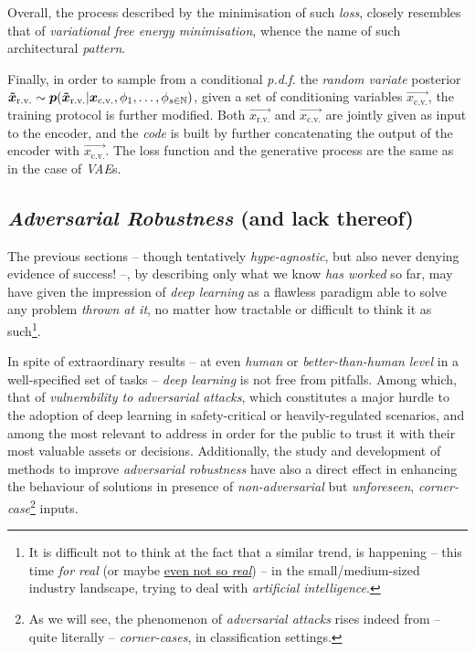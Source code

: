 Overall, the process described by the minimisation of such \textit{loss}, closely resembles that of \textit{variational free energy minimisation}, whence the name of such architectural \textit{pattern}.

Finally, in order to sample from a conditional \textit{p.d.f.} the \textit{random variate} posterior\linebreak
${\bm{\tilde{x}_{\text{r.v.}}} \sim \bm{p}(\bm{\tilde{x}_{\text{r.v.}}} | \bm{{x}_{\text{c.v.}}}, \phi_1, \dots, \phi_{s\in\mathbb{N}})}$, given a set of conditioning variables $\vec{{x}_{\text{c.v.}}}$, the training protocol is further modified. Both $\vec{{x}_{\text{r.v.}}}$ and $\vec{{x}_{\text{c.v.}}}$ are jointly given as input to the encoder, and the \textit{code} is built by further concatenating the output of the encoder with $\vec{{x}_{\text{c.v.}}}$. The loss function and the generative process are the same as in the case of \textit{VAE}s.

\subsection{\textit{Adversarial Robustness} (and lack thereof)}

The previous sections -- though tentatively \textit{hype-agnostic}, but also never denying evidence of success! --, by describing only what we know \textit{has worked} so far, may have given the impression of \textit{deep learning} as a flawless paradigm able to solve any problem \textit{thrown at it}, no matter how tractable or difficult to think it as such\footnote{It is difficult not to think at the fact that a similar trend, is happening -- this time \textit{for real} (or maybe \href{https://cutt.ly/europe_ai_startup_not_ai}{even not so \textit{real}}) -- in the small/medium-sized industry landscape, trying to deal with \textit{artificial intelligence}.}.

In spite of extraordinary results -- at even \textit{human} or \textit{better-than-human} \textit{level} in a well-specified set of tasks -- \textit{deep learning} is not free from pitfalls. Among which, that of \textit{vulnerability to adversarial attacks}, which constitutes a major hurdle to the adoption of deep learning in safety-critical or heavily-regulated scenarios, and among the most relevant to address in order for the public to trust it with their most valuable assets or decisions. Additionally, the study and development of methods to improve \textit{adversarial robustness} have also a direct effect in enhancing the behaviour of solutions in presence of \textit{non-adversarial} but \textit{unforeseen}, \textit{corner-case}\footnote{As we will see, the phenomenon of \textit{adversarial attacks} rises indeed from -- quite literally -- \textit{corner-cases}, in classification settings.} inputs.

